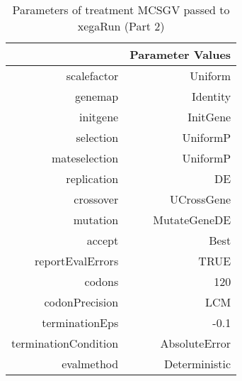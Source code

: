 \begin{table}[ht]
\centering
\begin{tabular}{rr}
  \hline
 & Parameter Values \\ 
  \hline
scalefactor & Uniform \\ 
  genemap & Identity \\ 
  initgene & InitGene \\ 
  selection & UniformP \\ 
  mateselection & UniformP \\ 
  replication & DE \\ 
  crossover & UCrossGene \\ 
  mutation & MutateGeneDE \\ 
  accept & Best \\ 
  reportEvalErrors & TRUE \\ 
  codons & 120 \\ 
  codonPrecision & LCM \\ 
  terminationEps & -0.1 \\ 
  terminationCondition & AbsoluteError \\ 
  evalmethod & Deterministic \\ 
   \hline
\end{tabular}
\caption{ Parameters of treatment MCSGV passed to xegaRun
 (Part 2)} 
\end{table}
